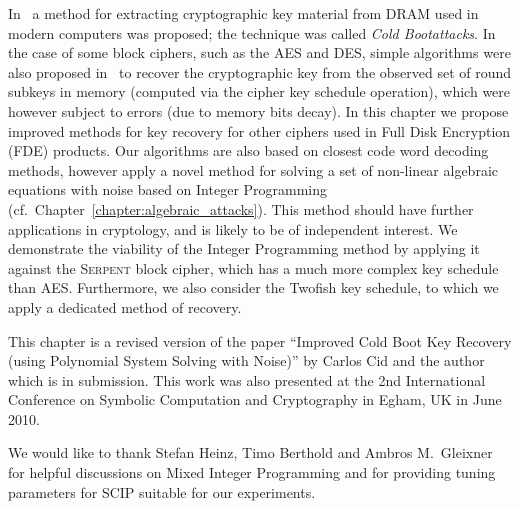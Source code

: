 \newcommand{\Ss}{\ensuremath{\mathcal{S}}}
\newcommand{\Hs}{\ensuremath{\mathcal{H}}}
\newcommand{\Serpent}{\textsc{Serpent}\xspace}
\newcommand{\Twofish}{Twofish\xspace}

\newcommand{\coldboot}{\emph{Cold Boot}\xspace}

In~\cite{coldboot08} a method for extracting cryptographic key material from DRAM used in modern computers was proposed; the technique was called \coldboot \emph{attacks}. In the case of some block ciphers, such as the AES and DES, simple algorithms were also proposed in~\cite{coldboot08} to recover the cryptographic key from the observed set of round subkeys in memory (computed via the cipher key schedule operation), which were however subject to errors (due to memory bits decay). In this chapter we propose improved methods for key recovery for other ciphers used in Full Disk Encryption (FDE) products. Our algorithms are also based on closest code word decoding methods, however apply a novel method for solving a set of non-linear algebraic equations with noise based on Integer Programming (cf.\ Chapter~\ref{chapter:algebraic_attacks}). This method should have further applications in cryptology, and is likely to be of independent interest. We demonstrate the viability of the Integer Programming method by applying it against the \Serpent block cipher, which has a much more complex key schedule than AES. Furthermore, we also consider the Twofish key schedule, to which we apply a dedicated method of recovery.

This chapter is a revised version of the paper ``Improved Cold Boot Key Recovery (using Polynomial System Solving with Noise)'' by Carlos Cid and the author which is in submission. This work was also presented at the 2nd International Conference on Symbolic Computation and Cryptography in Egham, UK in June 2010.

We would like to thank Stefan Heinz, Timo Berthold and Ambros M.\ Gleixner for helpful discussions on Mixed Integer Programming and for providing tuning parameters for SCIP suitable for our experiments.

